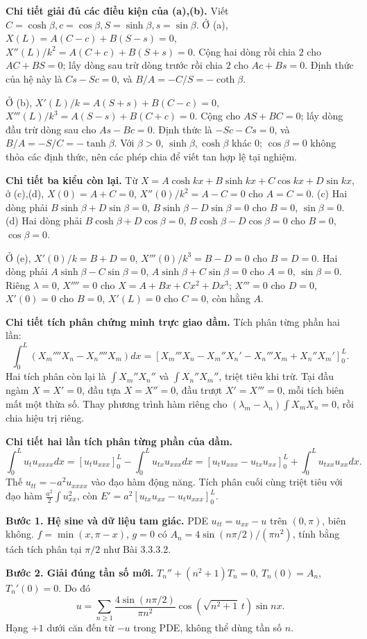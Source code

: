 \textbf{Chi tiết giải đủ các điều kiện của (a),(b).} Viết $C=\cosh\beta,c=\cos\beta,S=\sinh\beta,s=\sin\beta$.
Ở (a), $X(L)=A(C-c)+B(S-s)=0$, $X''(L)/k^2=A(C+c)+B(S+s)=0$. Cộng hai dòng rồi chia $2$ cho $AC+BS=0$; lấy dòng sau trừ dòng trước rồi chia $2$ cho $Ac+Bs=0$. Định thức của hệ này là $Cs-Sc=0$, và $B/A=-C/S=-\coth\beta$.

Ở (b), $X'(L)/k=A(S+s)+B(C-c)=0$, $X'''(L)/k^3=A(S-s)+B(C+c)=0$. Cộng cho $AS+BC=0$; lấy dòng đầu trừ dòng sau cho $As-Bc=0$. Định thức là $-Sc-Cs=0$, và $B/A=-S/C=-\tanh\beta$. Với $\beta>0$, $\sinh\beta,\cosh\beta$ khác $0$; $\cos\beta=0$ không thỏa các định thức, nên các phép chia để viết tan hợp lệ tại nghiệm.

\textbf{Chi tiết ba kiểu còn lại.} Từ $X=A\cosh kx+B\sinh kx+C\cos kx+D\sin kx$, ở (c),(d), $X(0)=A+C=0$, $X''(0)/k^2=A-C=0$ cho $A=C=0$. (c) Hai dòng phải $B\sinh\beta+D\sin\beta=0$, $B\sinh\beta-D\sin\beta=0$ cho $B=0$, $\sin\beta=0$. (d) Hai dòng phải $B\cosh\beta+D\cos\beta=0$, $B\cosh\beta-D\cos\beta=0$ cho $B=0$, $\cos\beta=0$.

Ở (e), $X'(0)/k=B+D=0$, $X'''(0)/k^3=B-D=0$ cho $B=D=0$. Hai dòng phải $A\sinh\beta-C\sin\beta=0$, $A\sinh\beta+C\sin\beta=0$ cho $A=0$, $\sin\beta=0$. Riêng $\lambda=0$, $X''''=0$ cho $X=A+Bx+Cx^2+Dx^3$; $X'''=0$ cho $D=0$, $X'(0)=0$ cho $B=0$, $X'(L)=0$ cho $C=0$, còn hằng $A$.

\textbf{Chi tiết tích phân chứng minh trực giao dầm.} Tích phân từng phần hai lần:
\[\int_0^L(X_m''''X_n-X_n''''X_m)dx=
[X_m'''X_n-X_m''X_n'-X_n'''X_m+X_n''X_m']_0^L.\]
Hai tích phân còn lại là $\int X_m''X_n''$ và $\int X_n''X_m''$, triệt tiêu khi trừ. Tại đầu ngàm $X=X'=0$, đầu tựa $X=X''=0$, đầu trượt $X'=X'''=0$, mỗi tích biên mất một thừa số. Thay phương trình hàm riêng cho $(\lambda_m-\lambda_n)\int X_mX_n=0$, rồi chia hiệu trị riêng.

\textbf{Chi tiết hai lần tích phân từng phần của dầm.}
\[\int_0^L u_tu_{xxxx}dx
=[u_tu_{xxx}]_0^L-\int_0^Lu_{tx}u_{xxx}dx
=[u_tu_{xxx}-u_{tx}u_{xx}]_0^L+\int_0^Lu_{txx}u_{xx}dx.\]
Thế $u_{tt}=-a^2u_{xxxx}$ vào đạo hàm động năng. Tích phân cuối cùng triệt tiêu với đạo hàm $\frac{a^2}{2}\int u_{xx}^2$, còn $E'=a^2[u_{tx}u_{xx}-u_tu_{xxx}]_0^L$.

\textbf{Bước 1. Hệ sine và dữ liệu tam giác.} PDE $u_{tt}=u_{xx}-u$ trên $(0,\pi)$, biên không. $f=\min(x,\pi-x)$, $g=0$ có $A_n=4\sin(n\pi/2)/(\pi n^2)$, tính bằng tách tích phân tại $\pi/2$ như Bài 3.3.3.2.

\textbf{Bước 2. Giải đúng tần số mới.} $T_n''+(n^2+1)T_n=0$, $T_n(0)=A_n$, $T_n'(0)=0$. Do đó
\[u=\sum_{n\ge1}\frac{4\sin(n\pi/2)}{\pi n^2}\cos(\sqrt{n^2+1}\,t)\sin nx.\]
Hạng $+1$ dưới căn đến từ $-u$ trong PDE, không thể dùng tần số $n$.

